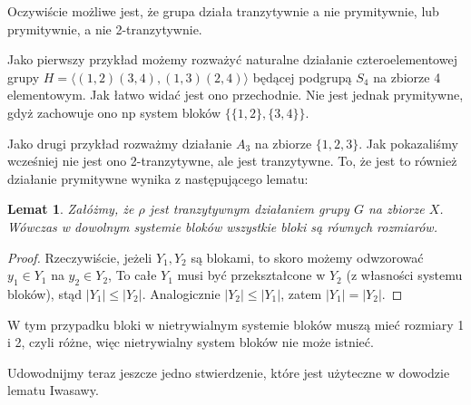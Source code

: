 \documentclass[licencjacka]{pracamgr}
\newtheorem{lemma}{Lemat}[section]
\begin{document}
Oczywiście możliwe jest, że grupa działa tranzytywnie a nie prymitywnie, lub prymitywnie, a nie 2-tranzytywnie.

Jako pierwszy przykład możemy rozważyć naturalne działanie czteroelementowej 
grupy $H= \langle (1,2)(3,4), (1,3)(2,4) \rangle$ będącej podgrupą $S_4$ na zbiorze 4 elementowym.
Jak łatwo widać jest ono przechodnie.
Nie jest jednak prymitywne, gdyż zachowuje ono np system bloków $\{\{1,2\}, \{3,4\}\}$.

Jako drugi przykład rozważmy działanie $A_3$ na zbiorze $\{1, 2, 3\}$.
Jak pokazaliśmy wcześniej nie jest ono 2-tranzytywne, ale jest tranzytywne.
To, że jest to również działanie prymitywne wynika z następującego lematu:

\begin{lemma}
	Załóżmy, że $\rho$ jest tranzytywnym działaniem grupy $G$ na zbiorze $X$.
	Wówczas w dowolnym systemie bloków wszystkie bloki są równych rozmiarów.
\end{lemma}
\begin{proof}
Rzeczywiście, jeżeli $Y_1, Y_2$ są blokami, to skoro możemy odwzorować $y_1 \in Y_1$ na $y_2 \in Y_2$, 
To całe $Y_1$ musi być przekształcone w $Y_2$ (z własności systemu bloków), stąd $|Y_1| \le |Y_2|$.
Analogicznie $|Y_2| \le |Y_1|$, zatem $|Y_1| = |Y_2|$.
\end{proof}


W tym przypadku bloki w nietrywialnym systemie bloków muszą mieć rozmiary 1 i 2,
czyli różne, więc nietrywialny system bloków nie może istnieć.

Udowodnijmy teraz jeszcze jedno stwierdzenie, które jest użyteczne w dowodzie lematu Iwasawy.
\end{document}
